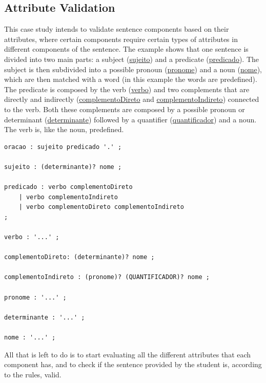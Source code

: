 \subsection{Attribute Validation}
This case study intends to validate sentence components based on their attributes, where certain components require certain types of attributes in different components of the sentence. The example shows that one sentence is divided into two main parts: a subject (\underline{sujeito}) and a predicate (\underline{predicado}). The subject is then subdivided into a possible pronoun (\underline{pronome}) and a noun (\underline{nome}), which are then matched with a word (in this example the words are predefined). The predicate is composed by the verb (\underline{verbo}) and two complements that are directly and indirectly (\underline{complementoDireto} and \underline{complementoIndireto}) connected to the verb. Both these complements are composed by a possible pronoun or determinant (\underline{determinante}) followed by a quantifier (\underline{quantificador}) and a noun. The verb is, like the noun, predefined.

\begin{center}
\begin{minipage}{12cm}
\begin{Verbatim}[frame=single, framesep=2mm, fontsize=\small]
oracao : sujeito predicado '.' ;

sujeito : (determinante)? nome ;

predicado : verbo complementoDireto
    | verbo complementoIndireto
    | verbo complementoDireto complementoIndireto
;

verbo : '...' ;

complementoDireto: (determinante)? nome ;

complementoIndireto : (pronome)? (QUANTIFICADOR)? nome ;

pronome : '...' ;

determinante : '...' ;

nome : '...' ;
\end{Verbatim}
\end{minipage}
\end{center}


All that is left to do is to start evaluating all the different attributes that each component has, and to check if the sentence provided by the student is, according to the rules, valid. 

